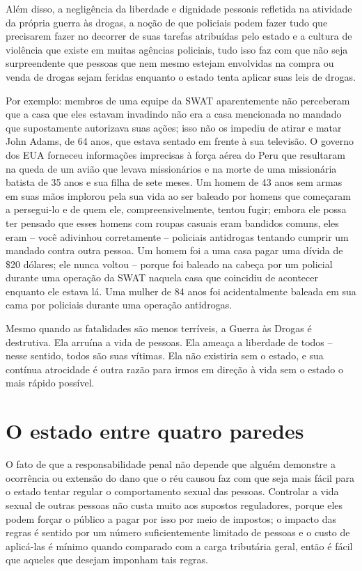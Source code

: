Além disso, a negligência da liberdade e dignidade pessoais refletida na atividade da própria guerra às drogas, a noção de que policiais podem fazer tudo que precisarem fazer no decorrer de suas tarefas atribuídas pelo estado e a cultura de violência que existe em muitas agências policiais, tudo isso faz com que não seja surpreendente que pessoas que nem mesmo estejam envolvidas na compra ou venda de drogas sejam feridas enquanto o estado tenta aplicar suas leis de drogas.

Por exemplo: membros de uma equipe da SWAT aparentemente não perceberam que a casa que eles estavam invadindo não era a casa mencionada no mandado que supostamente autorizava suas ações; isso não os impediu de atirar e matar John Adams, de 64 anos, que estava sentado em frente à sua televisão. O governo dos EUA forneceu informações imprecisas à força aérea do Peru que resultaram na queda de um avião que levava missionários e na morte de uma missionária batista de 35 anos e sua filha de sete meses. Um homem de 43 anos sem armas em suas mãos implorou pela sua vida ao ser baleado por homens que começaram a persegui-lo e de quem ele, compreensivelmente, tentou fugir; embora ele possa ter pensado que esses homens com roupas casuais eram bandidos comuns, eles eram -- você adivinhou corretamente -- policiais antidrogas tentando cumprir um mandado contra outra pessoa. Um homem foi a uma casa pagar uma dívida de \$20 dólares; ele nunca voltou -- porque foi baleado na cabeça por um policial durante uma operação da SWAT naquela casa que coincidiu de acontecer enquanto ele estava lá. Uma mulher de 84 anos foi acidentalmente baleada em sua cama por policiais durante uma operação antidrogas.

Mesmo quando as fatalidades são menos terríveis, a Guerra às Drogas é destrutiva. Ela arruína a vida de pessoas. Ela ameaça a liberdade de todos -- nesse sentido, todos são suas vítimas. Ela não existiria sem o estado, e sua contínua atrocidade é outra razão para irmos em direção à vida sem o estado o mais rápido possível.

\section{O estado entre quatro paredes}

O fato de que a responsabilidade penal não depende que alguém demonstre a ocorrência ou extensão do dano que o réu causou faz com que seja mais fácil para o estado tentar regular o comportamento sexual das pessoas. Controlar a vida sexual de outras pessoas não custa muito aos supostos reguladores, porque eles podem forçar o público a pagar por isso por meio de impostos; o impacto das regras é sentido por um número suficientemente limitado de pessoas e o custo de aplicá-las é mínimo quando comparado com a carga tributária geral, então é fácil que aqueles que desejam imponham tais regras.


